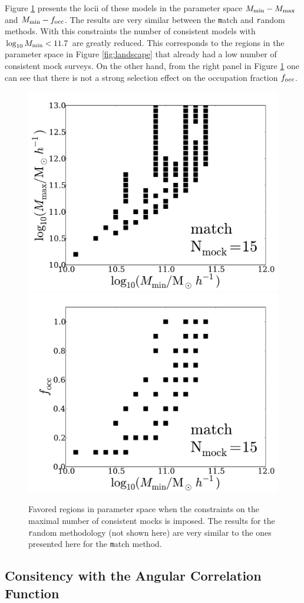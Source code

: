 \documentclass[usenatbib]{mn2e}
\begin{document}
Figure \ref{fig:restriction_mock} presents the locii of these models
in the parameter space $M_{\rm min}-M_{\rm max}$ and $M_{\rm
  min}-f_{\rm occ}$. The results are very similar between the {\texttt
  match} and {\texttt random} methods. With this constraints the
number of consistent models with  $\log_{10}M_{\rm min}< 11.7$ are
greatly reduced. This corresponds to the regions in the parameter
space in Figure \ref{fig:landscape} that already had a low number of
consistent mock surveys. On the other hand, from the right panel in
Figure \ref{fig:restriction_mock} one can see that there is not a
strong selection effect on the occupation fraction $f_{\rm occ}$.  


\begin{figure}
\begin{center}
\includegraphics[width=0.46\linewidth,angle=0]{./plots/Fig5_match_mass_mock.pdf} 
\hspace{5mm}
\includegraphics[width=0.46\linewidth,angle=0]{./plots/Fig5_match_f_occ_mock.pdf}
\end{center}  
\caption{Favored regions in parameter space when the constraints on
  the maximal number of consistent mocks is imposed. The results for
  the {\texttt random} methodology (not shown here) are very similar to the ones
  presented here for the {\texttt match} method.
  \label{fig:restriction_mock}}  
\end{figure}



\subsection{Consitency with the Angular Correlation Function}
\end{document}
